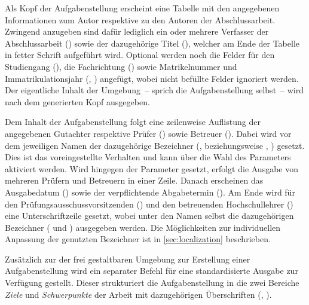 \begin{DeclareEntity}{}
\begin{Declaration}
\begin{Declaration}
\begin{Declaration}
Als Kopf der Aufgabenstellung erscheint eine Tabelle mit den angegebenen 
Informationen zum Autor respektive zu den Autoren der Abschlussarbeit. Zwingend 
anzugeben sind dafür lediglich ein oder mehrere Verfasser der Abschlussarbeit 
() sowie der dazugehörige Titel (), 
welcher am Ende der Tabelle in fetter Schrift aufgeführt wird. Optional werden 
noch die Felder für den Studiengang (), die Fachrichtung 
() sowie Matrikelnummer und Immatrikulationsjahr 
(, ) angefügt, wobei nicht 
befüllte Felder ignoriert werden. Der eigentliche Inhalt der Umgebung~-- sprich 
die Aufgabenstellung selbst~-- wird nach dem generierten Kopf ausgegeben.

Dem Inhalt der Aufgabenstellung folgt eine zeilenweise Auflistung der 
angegebenen Gutachter respektive Prüfer () sowie Betreuer 
(). Dabei wird vor dem jeweiligen Namen der dazugehörige 
Bezeichner (,  beziehungsweise 
, ) gesetzt. 
%
Dies ist das voreingestellte Verhalten und kann über die Wahl des Parameters
 aktiviert werden. Wird hingegen der 
Parameter  gesetzt, erfolgt die Ausgabe 
von mehreren Prüfern und Betreuern in einer Zeile. Danach erscheinen das 
Ausgabedatum () sowie der verpflichtende Abgabetermin 
(). Am Ende wird für den Prüfungsausschussvorsitzenden 
() und den betreuenden Hochschullehrer () 
eine Unterschriftzeile gesetzt, wobei unter den Namen selbst die dazugehörigen 
Bezeichner ( und ) ausgegeben werden. 
Die Möglichkeiten zur individuellen Anpassung der genutzten Bezeichner ist in 
\autoref{sec:localization} beschrieben. 
\end{Declaration}
\end{Declaration}
\end{Declaration}

\begin{Declaration}
  {}
\printdeclarationlist

Zusätzlich zur der frei gestaltbaren Umgebung  zur Erstellung
einer Aufgabenstellung wird ein separater Befehl für eine standardisierte 
Ausgabe zur Verfügung gestellt. Dieser strukturiert die Aufgabenstellung in die 
zwei Bereiche \emph{Ziele} und \emph{Schwerpunkte} der Arbeit mit dazugehörigen 
Überschriften (, ).


\end{Declaration}
\end{DeclareEntity}
